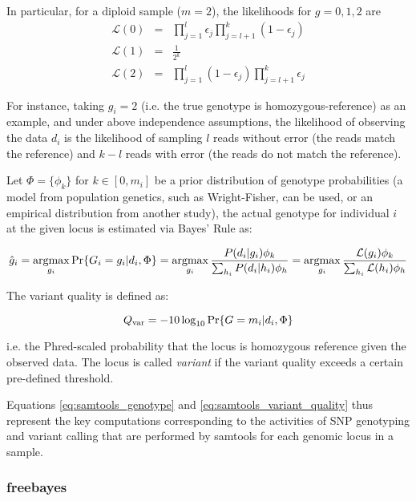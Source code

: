 In particular, for a diploid sample ($m=2$), the likelihoods for $g=0,1,2$ are
\begin{eqnarray}
    \label{eq:samtools_diploid_genotype_likelihoods}
    \mathcal{L}(0)&=&\prod_{j=1}^l\epsilon_j\prod_{j=l+1}^k(1-\epsilon_j)\\
    \mathcal{L}(1)&=&\frac{1}{2^k}\\
    \mathcal{L}(2)&=&\prod_{j=1}^l(1-\epsilon_j)\prod_{j=l+1}^k\epsilon_j
\end{eqnarray}

For instance, taking $g_i = 2$ (i.e. the true genotype is homozygous-reference) as an example, and under above independence assumptions, the likelihood of observing the data $d_i$ is the likelihood of sampling $l$ reads without error (the reads match the reference) and $k-l$ reads with error (the reads do not match the reference).

Let $\Phi = \{\phi_k\}$ for $k \in [0,m_i]$ be a prior distribution of genotype probabilities (a model from population genetics, such as Wright-Fisher, can be used, or an empirical distribution from another study), the actual genotype for individual $i$ at the given locus is estimated via Bayes' Rule as:

\begin{equation}
    \label{eq:samtools_genotype}
    \hat{g}_i=\operatorname*{argmax}_{g_i} \Pr\{G_i=g_i|d_i,\Phi\}=\operatorname*{argmax}_{g_i}\frac{P(d_i|g_i)\phi_k}{\sum_{h_i}P(d_i|h_i)\phi_h}=\operatorname*{argmax}_{g_i}\frac{\mathcal{L}(g_i)\phi_k}{\sum_{h_i}\mathcal{L}(h_i)\phi_h}
\end{equation}

The variant quality is defined as:

\begin{equation}
    \label{eq:samtools_variant_quality}
    Q_{\rm var}=-10\log_{10}\Pr\{G=m_i|d_i,\Phi\}
\end{equation}

i.e. the Phred-scaled probability that the locus is homozygous reference given the observed data. The locus is called \emph{variant} if the variant quality exceeds a certain pre-defined threshold.

Equations \ref{eq:samtools_genotype} and \ref{eq:samtools_variant_quality} thus represent the key computations corresponding to the activities of SNP genotyping and variant calling that are performed by samtools for each genomic locus in a sample.

\subsubsection{freebayes}

